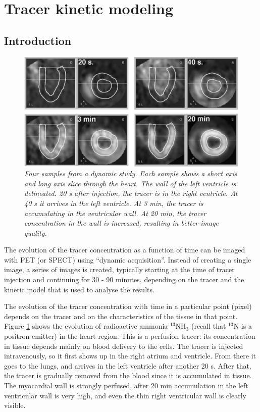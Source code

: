 \section{Tracer kinetic modeling}
\subsection{Introduction}
\begin{figure}[tb]
\centering
\includegraphics[width=\figbig]{figs/fig_dyncardio.pdf}
\caption{\label{fig:dyncardio} \emph{Four samples from a dynamic
study. Each sample shows a short axis and long axis slice through the
heart. The wall of the left ventricle is delineated. 20 s after
injection, the tracer is in the right ventricle. At 40 s it arrives in
the left ventricle. At 3 min, the tracer is accumulating in the
ventricular wall. At 20 min, the tracer concentration in the wall is
increased, resulting in better image quality.}}
\end{figure}

The evolution of the tracer concentration as a function of time can be
imaged with PET (or SPECT) using ``dynamic acquisition''. Instead of
creating a single image, a series of images is created, typically
starting at the time of tracer injection and continuing for 30 - 90
minutes, depending on the tracer and the kinetic model that is used to
analyse the results.

The evolution of the tracer concentration with time in a particular
point (pixel) depends on the tracer and on the characteristics of the
tissue in that point. Figure \ref{fig:dyncardio} shows the evolution
of radioactive ammonia $^{13}$NH$_3$ (recall that $^{13}$N is a
positron emitter) in the heart region. This is a perfusion tracer: its
concentration in tissue depends mainly on blood delivery to the
cells. The tracer is injected intravenously, so it first shows up in
the right atrium and ventricle. From there it goes to the lungs, and
arrives in the left ventricle after another 20 s. After that, the
tracer is gradually removed from the blood since it is accumulated in
tissue. The myocardial wall is strongly perfused, after 20 min
accumulation in the left ventricular wall is very high, and even the
thin right ventricular wall is clearly visible.

